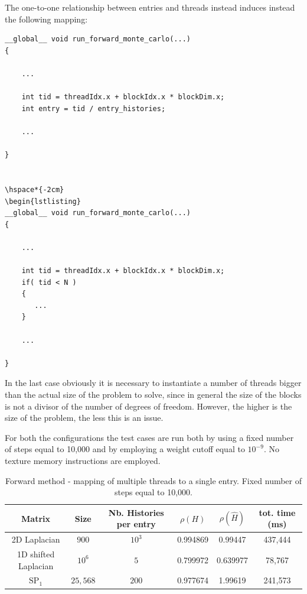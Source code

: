 \documentclass[a4paper,10pt]{article}
\begin{document}
The one-to-one relationship between entries and threads instead induces 
instead the following mapping:

\begin{lstlisting}
__global__ void run_forward_monte_carlo(...)
{

    ...
   
    int tid = threadIdx.x + blockIdx.x * blockDim.x;
    int entry = tid / entry_histories;
    
    ...

} 


\hspace*{-2cm}
\begin{lstlisting}
__global__ void run_forward_monte_carlo(...)
{

    ...
    
    int tid = threadIdx.x + blockIdx.x * blockDim.x; 
    if( tid < N )
    {
       ...
    }
    
    ...

}   
\end{lstlisting}


In the last case obviously it is necessary to instantiate a number of threads 
bigger than the actual size of the problem to solve, since in general the size 
of the blocks is not a divisor of the number of degrees of freedom. However, 
the higher is the size of the problem, the less this is an issue.\newline

For both the configurations the test cases are run both by using a fixed number 
of steps equal to 10,000 and by employing a weight cutoff equal to $10^{-9}$. 
No texture memory instructions are employed.


\begin{table}[!h]
\begin{tabular}{|c|c|c|c|c|c|}
\hline
\textbf{Matrix} & \textbf{Size} &\textbf{Nb. Histories per entry} & $\rho(H)$ 
& $\rho(\hat{H})$ & tot. time (ms)\\
\hline
2D Laplacian& $900$ & $10^3$ & 0.994869 & 0.99447 & 437,444 \\
\hline 
1D shifted Laplacian& $10^6$ & $5$ & 0.799972 & 0.639977 & 78,767\\
\hline
$\text{SP}_1$ & $25,568$ & $200$ & 0.977674 & 1.99619 & 241,573\\
\hline
\end{tabular}
\caption{Forward method - mapping of multiple threads to a single entry. Fixed 
number of steps equal to 10,000.}
\label{tab22}
\end{table}
\end{document}
